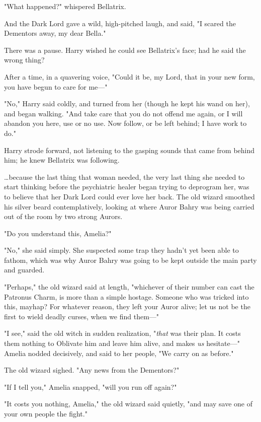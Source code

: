 "What happened?" whispered Bellatrix.

And the Dark Lord gave a wild, high-pitched laugh, and said, "I scared the 
Dementors away, my dear Bella."

There was a pause. Harry wished he could see Bellatrix's face; had he said the 
wrong thing?

After a time, in a quavering voice, "Could it be, my Lord, that in your new 
form, you have begun to care for me---"

"No," Harry said coldly, and turned from her (though he kept his wand on her), 
and began walking. "And take care that you do not offend me again, or I will 
abandon you here, use or no use. Now follow, or be left behind; I have work to 
do."

Harry strode forward, not listening to the gasping sounds that came from behind 
him; he knew Bellatrix was following.

{\ldots}because the last thing that woman needed, the very last thing she 
needed to start thinking before the psychiatric healer began trying to 
deprogram her, was to believe that her Dark Lord could ever love her back.
\sbreak
The old wizard smoothed his silver beard contemplatively, looking at where 
Auror Bahry was being carried out of the room by two strong Aurors.

"Do you understand this, Amelia?"

"No," she said simply. She suspected some trap they hadn't yet been able to 
fathom, which was why Auror Bahry was going to be kept outside the main party 
and guarded.

"Perhaps," the old wizard said at length, "whichever of their number can cast 
the Patronus Charm, is more than a simple hostage. Someone who was tricked into 
this, mayhap? For whatever reason, they left your Auror alive; let us not be 
the first to wield deadly curses, when we find them---"

"I see," said the old witch in sudden realization, "\emph{that} was their plan. 
It costs them nothing to Oblivate him and leave him alive, and makes \emph{us} 
hesitate---" Amelia nodded decisively, and said to her people, "We carry on as 
before."

The old wizard sighed. "Any news from the Dementors?"

"If I tell you," Amelia snapped, "will you run off again?"

"It costs you nothing, Amelia," the old wizard said quietly, "and may save one 
of your own people the fight."

